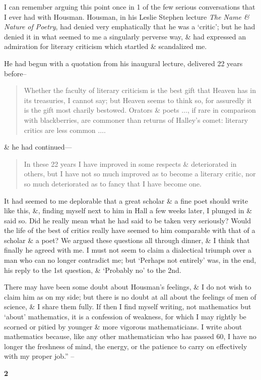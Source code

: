 \documentclass{article}
\numberwithin{equation}{section}
\begin{document}
I can remember arguing this point once in 1 of the few serious conversations that I ever had with Housman. Housman, in his Leslie Stephen lecture \textit{The Name \& Nature of Poetry}, had denied very emphatically that he was a `critic'; but he had denied it in what seemed to me a singularly perverse way, \& had expressed an admiration for literary criticism which startled \& scandalized me.

He had begun with a quotation from his inaugural lecture, delivered 22 years before--
\begin{quotation}
	Whether the faculty of literary criticism is the best gift that Heaven has in its treasuries, I cannot say; but Heaven seems to think so, for assuredly it is the gift most charily bestowed. Orators \& poets $\ldots$, if rare in comparison with blackberries, are commoner than returns of Halley's comet: literary critics are less common $\ldots$.
\end{quotation}
\& he had continued---
\begin{quotation}
	In these 22 years I have improved in some respects \& deteriorated in others, but I have not so much improved as to become a literary critic, nor so much deteriorated as to fancy that I have become one.
\end{quotation}
It had seemed to me deplorable that a great scholar \& a fine poet should write like this, \&, finding myself next to him in Hall a few weeks later, I plunged in \& said so. Did he really mean what he had said to be taken very seriously? Would the life of the best of critics really have seemed to him comparable with that of a scholar \& a poet? We argued these questions all through dinner, \& I think that finally he agreed with me. I must not seem to claim a dialectical triumph over a man who can no longer contradict me; but `Perhaps not entirely' was, in the end, his reply to the 1st question, \& `Probably no' to the 2nd.

There may have been some doubt about Housman's feelings, \& I do not wish to claim him as on my side; but there is no doubt at all about the feelings of men of science, \& I share them fully. If then I find myself writing, not mathematics but `about' mathematics, it is a confession of weakness, for which I may rightly be scorned or pitied by younger \& more vigorous mathematicians. I write about mathematics because, like any other mathematician who has passed 60, I have no longer the freshness of mind, the energy, or the patience to carry on effectively with my proper job.'' -- \cite[pp. 61--63]{Hardy1992}

\begin{center}
	\textbf{2}
\end{center}


\printbibliography[heading=bibintoc]
	
\end{document}
